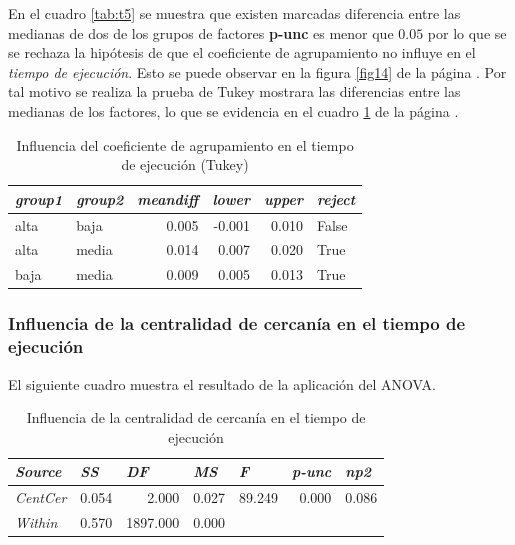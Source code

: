 \documentclass{article}
\begin{document}
En el cuadro \ref{tab:t5} se muestra que existen marcadas diferencia entre las medianas de dos de los grupos de factores {\bf p-unc} es menor que $0.05$ por lo que se se rechaza la hipótesis de que el coeficiente de agrupamiento no influye en el \textit{tiempo de ejecución}. Esto se puede observar en la figura \ref{fig14} de la página \pageref{fig14}. Por tal motivo se realiza la prueba de Tukey mostrara las diferencias entre las medianas de los factores, lo que se evidencia en el cuadro \ref{tab:t6} de la página \pageref{tab:t6}.

\begin{table}[htbp]
  \centering
  \caption{Influencia del coeficiente de agrupamiento en el tiempo de ejecución (Tukey)}
    \begin{tabular}{llrrrl}
    \toprule
    \textit{\textbf{group1}} & \textit{\textbf{group2}} & \multicolumn{1}{l}{\textit{\textbf{meandiff}}} & \multicolumn{1}{l}{\textit{\textbf{lower}}} & \multicolumn{1}{l}{\textit{\textbf{upper}}} & \textit{\textbf{reject}} \\
    \midrule
    alta  & baja  & 0.005 & -0.001 & 0.010 & False \\
    alta  & media & 0.014 & 0.007 & 0.020 & True \\
    baja  & media & 0.009 & 0.005 & 0.013 & True \\
    \bottomrule
    \end{tabular}%
  \label{tab:t6}%
\end{table}%


\subsubsection{Influencia de la centralidad de cercanía en el tiempo de ejecución}

El siguiente cuadro muestra el resultado de la aplicación del ANOVA.

\begin{table}[htbp]
  \centering
  \caption{Influencia de la centralidad de cercanía en el tiempo de ejecución}
    \begin{tabular}{lrrrrrr}
    \toprule
    \textit{\textbf{Source}} & \multicolumn{1}{l}{\textit{\textbf{SS}}} & \multicolumn{1}{l}{\textit{\textbf{DF}}} & \multicolumn{1}{l}{\textit{\textbf{MS}}} & \multicolumn{1}{l}{\textit{\textbf{F}}} & \multicolumn{1}{l}{\textit{\textbf{p-unc}}} & \multicolumn{1}{l}{\textit{\textbf{np2}}} \\
    \midrule
    \textit{CentCer} & 0.054 & 2.000 & 0.027 & 89.249 & 0.000 & 0.086 \\
    \textit{Within} & 0.570 & 1897.000 & 0.000 &       &       &  \\
    \bottomrule
    \end{tabular}%
  \label{tab:t7}%
\end{table}%
\end{document}
